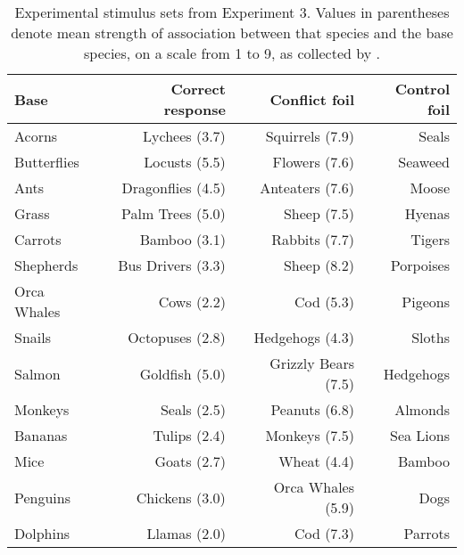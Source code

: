 
\begin{table}[hb]
  \centering
  \caption[]{
    Experimental stimulus sets from Experiment 3.
    Values in parentheses denote mean strength of association
    between that species and the base species,
    on a scale from 1 to 9, as collected by \citet{Crisp-Bright2010}.
  }
  \label{tbl:crisp-stimuli}
  \begin{tabular}{lrrr}
    \toprule
    Base        & Correct response & Conflict foil      & Control foil\\
    \midrule
    Acorns      & Lychees (3.7)     & Squirrels (7.9)     & Seals\\
    Butterflies & Locusts (5.5)     & Flowers (7.6)       & Seaweed\\
    Ants        & Dragonflies (4.5) & Anteaters (7.6)     & Moose\\
    Grass       & Palm Trees (5.0)  & Sheep (7.5)         & Hyenas\\
    Carrots     & Bamboo (3.1)      & Rabbits (7.7)       & Tigers\\
    Shepherds   & Bus Drivers (3.3) & Sheep (8.2)         & Porpoises\\
    Orca Whales & Cows (2.2)        & Cod (5.3)           & Pigeons\\
    Snails      & Octopuses (2.8)   & Hedgehogs (4.3)     & Sloths\\
    Salmon      & Goldfish (5.0)    & Grizzly Bears (7.5) & Hedgehogs\\
    Monkeys     & Seals (2.5)       & Peanuts (6.8)       & Almonds\\
    Bananas     & Tulips (2.4)      & Monkeys (7.5)       & Sea Lions\\
    Mice        & Goats (2.7)       & Wheat (4.4)         & Bamboo\\
    Penguins    & Chickens (3.0)    & Orca Whales (5.9)   & Dogs\\
    Dolphins    & Llamas (2.0)      & Cod (7.3)           & Parrots\\
    \bottomrule
  \end{tabular}
\end{table}
